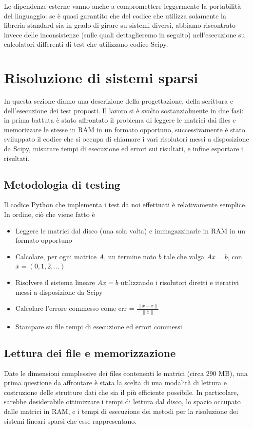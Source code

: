 \documentclass[11pt,a4paper]{scrartcl}
\begin{document}
Le dipendenze esterne vanno anche a compromettere leggermente la portabilità del linguaggio: se è quasi garantito che del codice che utilizza solamente la libreria standard sia in grado di girare su sistemi diversi, abbiamo riscontrato invece delle inconsistenze (sulle quali dettaglieremo in seguito) nell'esecuzione su calcolatori differenti di test che utilizzano codice Scipy. 

\section*{Risoluzione di sistemi sparsi}

In questa sezione diamo una descrizione della progettazione, della scrittura e dell'esecuzione dei test proposti. Il lavoro si è svolto sostanzialmente in due fasi: in prima battuta è stato affrontato il problema di leggere le matrici dai files e memorizzare le stesse in RAM in un formato opportuno, successivamente è stato sviluppato il codice che si occupa di chiamare i vari risolutori messi a disposizione da Scipy, misurare tempi di esecuzione ed errori sui risultati, e infine esportare i risultati.

\subsection*{Metodologia di testing}
Il codice Python che implementa i test da noi effettuati è relativamente semplice. In ordine, ciò che viene fatto è
\begin{itemize}
	\item Leggere le matrici dal disco (una sola volta) e immagazzinarle in RAM in un formato opportuno
	\item Calcolare, per ogni matrice $A$, un termine noto $b$ tale che valga $A\overline{x} = b$, con $\overline{x} = (0, 1, 2, \dots)$
	\item Risolvere il sistema lineare $Ax = b$ utilizzando i risolutori diretti e iterativi messi a disposizione da Scipy
	\item Calcolare l'errore commesso come err = $\tfrac{\parallel \overline{x} - x \parallel}{\parallel \overline{x} \parallel}$
	\item Stampare su file tempi di esecuzione ed errori commessi
\end{itemize}

\subsection*{Lettura dei file e memorizzazione}
Date le dimensioni complessive dei files contenenti le matrici (circa 290 MB), una prima questione da affrontare è stata la scelta di una modalità di lettura e costruzione delle strutture dati che sia il più efficiente possibile. In particolare, sarebbe desiderabile ottimizzare i tempi di lettura dal disco, lo spazio occupato dalle matrici in RAM, e i tempi di esecuzione dei metodi per la risoluzione dei sistemi lineari sparsi che esse rappresentano.
\end{document}
